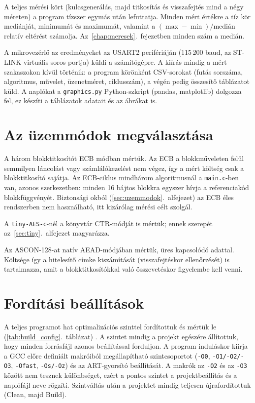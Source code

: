 \documentclass[a4paper,12pt]{report}
\theoremstyle{definition}
\theoremstyle{remark}
\begin{document}
A teljes mérési kört (kulcsgenerálás, majd titkosítás és visszafejtés mind a négy méreten) a program tízszer egymás után lefuttatja. Minden mért értékre a tíz kör mediánját, minimumát és maximumát, valamint a $(\max - \min)/\text{medián}$ relatív eltérést számolja. Az~\ref{chap:meresek}.~fejezetben minden szám a medián.

A mikrovezérlő az eredményeket az USART2 perifériáján (115\,200 baud, az ST-LINK virtuális soros portja) küldi a számítógépre. A kiírás mindig a mért szakaszokon kívül történik: a program körönként CSV-sorokat (futás sorszáma, algoritmus, művelet, üzenetméret, ciklusszám), a végén pedig összesítő táblázatot küld. A naplókat a \texttt{graphics.py} Python-szkript (pandas, matplotlib) dolgozza fel, ez készíti a táblázatok adatait és az ábrákat is.

\section{Az üzemmódok megválasztása}\label{sec:uzemmod_valasztas}

A három blokktitkosítót ECB módban mértük. Az ECB a blokkműveleten felül semmilyen láncolást vagy számlálókezelést nem végez, így a mért költség csak a blokktitkosító sajátja. Az ECB-ciklus mindhárom algoritmusnál a \texttt{main.c}-ben van, azonos szerkezetben: minden 16 bájtos blokkra egyszer hívja a referenciakód blokkfüggvényét. Biztonsági okból (\ref{sec:uzemmodok}.~alfejezet) az ECB éles rendszerben nem használható, itt kizárólag mérési célt szolgál.

A \texttt{tiny-AES-c}-nél a könyvtár CTR-módját is mértük; ennek szerepét az~\ref{sec:tiny}.~alfejezet magyarázza.

Az ASCON-128-at natív AEAD-módjában mértük, üres kapcsolódó adattal. Költsége így a hitelesítő címke kiszámítását (visszafejtéskor ellenőrzését) is tartalmazza, amit a blokktitkosítókkal való összevetéskor figyelembe kell venni.

\section{Fordítási beállítások}\label{sec:forditas}

A teljes programot hat optimalizációs szinttel fordítottuk és mértük le (\ref{tab:build_config}.~táblázat) \cite{GCCopt}. A szintet mindig a projekt egészére állítottuk, hogy minden forrásfájl azonos beállítással forduljon. A program induláskor kiírja a GCC előre definiált makróiból megállapítható szintcsoportot (\texttt{-O0}, \texttt{-O1/-O2/-O3}, \texttt{-Ofast}, \texttt{-Os/-Oz}) és az ART-gyorsító beállítását. A makrók az \texttt{-O2} és az \texttt{-O3} között nem tesznek különbséget, ezért a pontos szintet a projektbeállítás és a naplófájl neve rögzíti. Szintváltás után a projektet mindig teljesen újrafordítottuk (Clean, majd Build).
\end{document}
